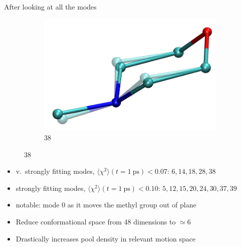 \documentclass{beamer}
\begin{document}
\begin{frame}{After looking at all the modes}
\begin{figure}
\begin{subfigure}{\widthx\textwidth}
				\includegraphics[width=\textwidth]{mode38_ot.png}
				\caption{38}
			\end{subfigure}
		\end{figure}
	
	\begin{itemize}
		\item v.\ strongly fitting modes, $\langle\chi^2\rangle(t = 1\ \textrm{ps}) < 0.07$: $6,14,18,28,38$
		\item strongly fitting modes, $\langle\chi^2\rangle(t = 1\ \textrm{ps}) < 0.10$: $5,12,15,20,24,30,37,39$
		\item notable: mode 0 as it moves the methyl group out of plane
		\item Reduce conformational space from 48 dimensions to $\simeq 6$
		\item Drastically increases pool density in relevant motion space
	\end{itemize}
\end{frame}
\end{document}
